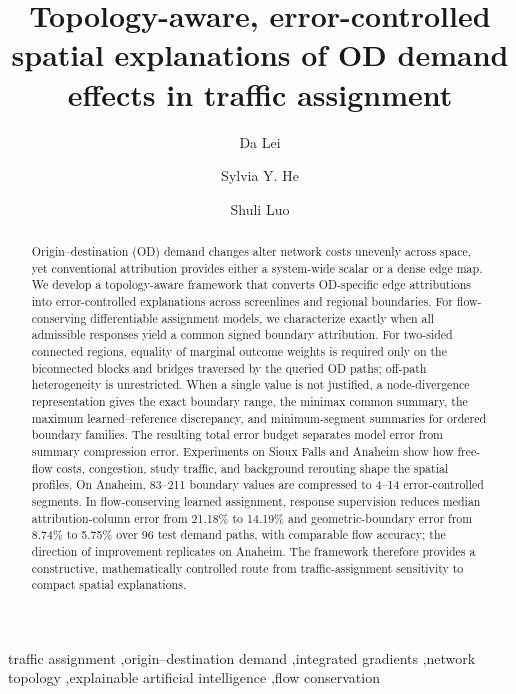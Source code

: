 \documentclass[a4paper,fleqn]{cas-sc}
\begin{document}
\title[mode=title]{Topology-aware, error-controlled spatial explanations of OD demand effects in traffic assignment}
\author[1]{Da Lei}
\author[2]{Sylvia Y. He}
\cormark[1]
\author[3]{Shuli Luo}
\begin{abstract}
Origin--destination (OD) demand changes alter network costs unevenly across space, yet conventional attribution provides either a system-wide scalar or a dense edge map. We develop a topology-aware framework that converts OD-specific edge attributions into error-controlled explanations across screenlines and regional boundaries. For flow-conserving differentiable assignment models, we characterize exactly when all admissible responses yield a common signed boundary attribution. For two-sided connected regions, equality of marginal outcome weights is required only on the biconnected blocks and bridges traversed by the queried OD paths; off-path heterogeneity is unrestricted. When a single value is not justified, a node-divergence representation gives the exact boundary range, the minimax common summary, the maximum learned--reference discrepancy, and minimum-segment summaries for ordered boundary families. The resulting total error budget separates model error from summary compression error. Experiments on Sioux Falls and Anaheim show how free-flow costs, congestion, study traffic, and background rerouting shape the spatial profiles. On Anaheim, 83--211 boundary values are compressed to 4--14 error-controlled segments. In flow-conserving learned assignment, response supervision reduces median attribution-column error from 21.18\% to 14.19\% and geometric-boundary error from 8.74\% to 5.75\% over 96 test demand paths, with comparable flow accuracy; the direction of improvement replicates on Anaheim. The framework therefore provides a constructive, mathematically controlled route from traffic-assignment sensitivity to compact spatial explanations.
\end{abstract}
\begin{keywords}
traffic assignment \sep origin--destination demand \sep integrated gradients \sep network topology \sep explainable artificial intelligence \sep flow conservation
\end{keywords}
\maketitle
{}
\end{document}
